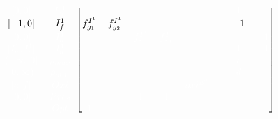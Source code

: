 \documentclass{beamer}
\def\w{\color{white}}
\def\b{\color{black}}
\begin{document}
\begin{frame}[shrink=25]
\begin{equation*}
\begin{blockarray}{cccccccccc}
\begin{block}{cc[cccccccc]}
            \w {[0,0]}         & \w E_{i}^{1}      &                   &
                               &                   &                   &
                               &                   & \w 1              &
             \\
            \b {[-1,0]}        & \b I_{f}^{1}      &\b f_{g_{1}}^{I^{1}}&
            \b f_{g_{2}}^{I^{1}}&                  &                    &
                               &                   & \b -1              &
             \\
            \w {[0,0]}         & \w I_{d}^{1}      &                   &
                               &\w f_{s_{1}}^{I^{1}}&\w f_{s_{2}}^{I^{1}}&
                               &                   &                   &
            \w -1              \\
            \w {[I_{c}^{1},I_{c}^{!}]}
                               & \w I_{b}^{1}      &                   &
                               &                   &                   &
                               &                   & \w 1              &
            \w -1              \\ 
            \w {(-\infty,0]}   & \w \rho_{max}     &                   &
                               &                   &                   &
                               &                   & \w c              &
             \\
            \w {[0,\infty)}    & \w \rho_{min}     &                   &
                               &                   &                   &
                               &                   & \w d              & 
             \\
            \w {[e,f]}         & \w Oxi            &                   &
                               &                   &                   &
            \w oxi^{E^{1}}     &                   &                   &
             \\
            \w {[0,0]}         & \w Pres           &                   &
                               & \w 1              & \w 1              &
                               &                   &                   &
             \\
                               & \w Opt            & \w 1              &
                               &                   &                   &
                               &                   &                   &
             \\
            \end{block}
        \end{blockarray}
    \end{equation*}

\end{frame}
\end{document}
